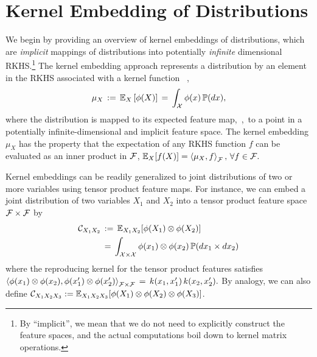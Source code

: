 \documentclass{article}
\begin{document}
%



\section{Kernel Embedding of Distributions}
\label{sec:embedding}

We begin by providing an overview of kernel embeddings of distributions, which are \emph{implicit} mappings of distributions into potentially \emph{infinite} dimensional RKHS.\footnote{By ``implicit'', we mean that we do not need to explicitly construct the feature spaces, and the actual computations boil down to kernel matrix operations.} The kernel embedding approach represents a distribution by an element in the RKHS associated with a kernel function \, \cite{SmoGreSonSch07,SriGreFukLanetal08},
\begin{align}
  \mu_{X} \, := \, \mathbb{E}_{X} \left[\phi(X)\right] \, = \, \int_{\mathcal{X}} \phi(x) \, \mathbb{P}(dx),  \label{eq:embedding}
\end{align}
where the distribution is mapped to its expected feature map,~\ie,~to a point in a potentially infinite-dimensional and implicit feature space.
 The kernel embedding $\mu_{X}$ has the property that the expectation of any RKHS function $f$ can be evaluated as an inner product in $\mathcal{F}$,
$
  \mathbb{E}_{X} [f(X)] = \left\langle \mu_{X},f \right\rangle_{\mathcal{F}}, \, \forall f\in\mathcal{F}.
$

Kernel embeddings can be readily generalized to joint distributions of two or more variables using tensor product feature maps. For instance, we can embed a joint distribution of two variables $X_1$ and $X_2$ into a tensor product feature space $\mathcal{F}\times \mathcal{F}$ by
\begin{align}
    \mathcal{C}_{X_1X_2} \, &:= \, \mathbb{E}_{X_1X_2}[\phi(X_1)\otimes \phi(X_2)] \\
    \, &= \, \int_{\mathcal{X} \times \mathcal{X}} \phi(x_1) \otimes \phi(x_2) \, \mathbb{P}(dx_1 \times dx_2)
\end{align}
where the reproducing kernel for the tensor product features satisfies
$
	\left\langle \phi(x_1)\otimes \phi(x_2) ,\phi(x_1')\otimes \phi(x_2')  \right\rangle_{\mathcal{F}\times \mathcal{F}} \, = \,  k(x_1,x_1')\,k(x_2,x_2').
$
By analogy, we can also define $\mathcal{C}_{X_1X_2X_3} := \mathbb{E}_{X_1X_2X_3}[\phi(X_1)\otimes\phi(X_2)\otimes \phi(X_3)]$.
\end{document}
